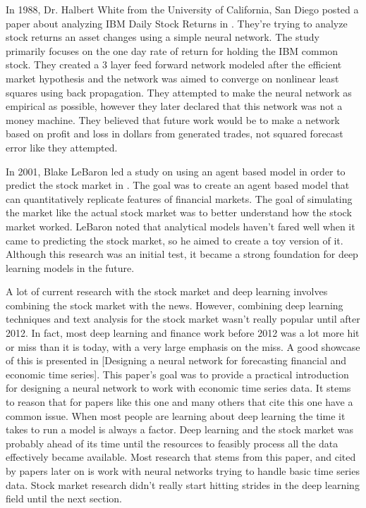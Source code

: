 \documentclass{article}
\theoremstyle{plain}
\theoremstyle{definition}
\numberwithin{equation}{section}
\numberwithin{theorem}{section}
\numberwithin{lemma}{section}
\numberwithin{definition}{section}
\numberwithin{proposition}{section}
\numberwithin{corollary}{section}
\begin{document}
	
	In 1988, Dr. Halbert White from the University of California, San Diego posted a paper about analyzing IBM Daily Stock Returns in \cite{White1988}. They're trying to analyze stock returns an asset changes using a simple neural network. The study primarily focuses on the one day rate of return for holding the IBM common stock. They created a 3 layer feed forward network modeled after the efficient market hypothesis and the network was aimed to converge on nonlinear least squares using back propagation. They attempted to make the neural network as empirical as possible, however they later declared that this network was not a money machine. They believed that future work would be to make a network based on profit and loss in dollars from generated trades, not squared forecast error like they attempted.
	
	
	In 2001, Blake LeBaron led a study on using an agent based model in order to predict the stock market in \cite{LeBaron2001}. The goal was to create an agent based model that can quantitatively replicate features of financial markets. The goal of simulating the market like the actual stock market was to better understand how the stock market worked. LeBaron noted that analytical models haven't fared well when it came to predicting the stock market, so he aimed to create a toy version of it. Although this research was an initial test, it became a strong foundation for deep learning models in the future.
	
	
	A lot of current research with the stock market and deep learning involves combining the stock market with the news. However, combining deep learning techniques and text analysis for the stock market wasn't really popular until after 2012. In fact, most deep learning and finance work before 2012 was a lot more hit or miss than it is today, with a very large emphasis on the miss. A good showcase of this is presented in [Designing a neural network for forecasting financial and economic time series]. This paper's goal was to provide a practical introduction for designing a neural network to work with economic time series data. It stems to reason that for papers like this one and many others that cite this one have a common issue. When most people are learning about deep learning the time it takes to run a model is always a factor. Deep learning and the stock market was probably ahead of its time until the resources to feasibly process all the data effectively became available. Most research that stems from this paper, and cited by papers later on is work with neural networks trying to handle basic time series data. Stock market research didn't really start hitting strides in the deep learning field until the next section.
	
\end{document}
